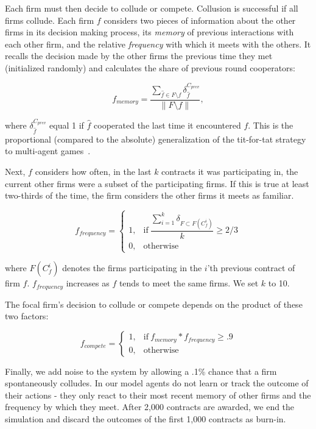 Each firm must then decide to collude or compete. Collusion is successful if all firms collude. Each firm $f$ considers two pieces of information about the other firms in its decision making process, its \textit{memory} of previous interactions with each other firm, and the relative \textit{frequency} with which it meets with the others. It recalls the decision made by the other firms the previous time they met (initialized randomly) and calculates the share of previous round cooperators:

$$f_{memory}=\dfrac{ \sum_{\hat{f} \in F\setminus f} 
  \delta_{\hat{f}}^{C_{prev}}}
{\|F\setminus f \|}, $$

where $\delta_{\hat{f}}^{C_{prev}}$ equal 1 if $\hat{f}$ cooperated the last time it encountered $f$. This is the proportional (compared to the absolute) generalization of the tit-for-tat strategy to multi-agent games~\cite{axelrod1981evolution}.

Next, $f$ considers how often, in the last $k$ contracts it was participating in, the current other firms were a subset of the participating firms. If this is true at least two-thirds of the time, the firm considers the other firms it meets as familiar.

$$ f_{frequency} = 
    \begin{cases}
      1, & \text{if}\ \dfrac{\sum_{i=1}^{k} \delta_{F \subset F(C_{f}^{i})}}{k} \geq 2/3 \\
      0, & \text{otherwise}
    \end{cases}
$$

where $F(C_{f}^{i})$ denotes the firms participating in the $i$'th previous contract of firm $f$. $f_{frequency}$ increases as $f$ tends to meet the same firms. We set $k$ to 10. 

The focal firm's decision to collude or compete depends on the product of these two factors:

$$f_{compete} =  
    \begin{cases}
      1, & \text{if}\ f_{memory} * f_{frequency} \geq .9 \\
      0, & \text{otherwise}
    \end{cases}
$$

Finally, we add noise to the system by allowing a .1\% chance that a firm spontaneously colludes. In our model agents do not learn or track the outcome of their actions - they only react to their most recent memory of other firms and the frequency by which they meet. After 2,000 contracts are awarded, we end the simulation and discard the outcomes of the first 1,000 contracts as burn-in.



